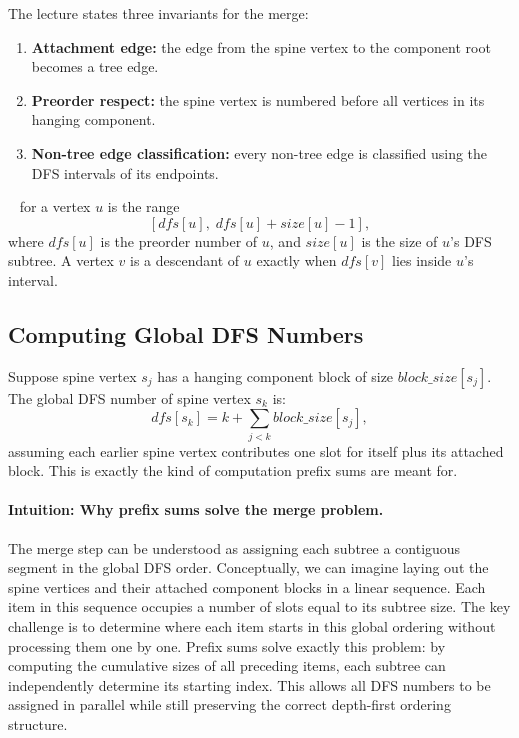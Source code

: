 The lecture states three invariants for the merge:

\begin{enumerate}
    \item \textbf{Attachment edge:} the edge from the spine vertex to the component root becomes a tree edge.
    \item \textbf{Preorder respect:} the spine vertex is numbered before all vertices in its hanging component.
    \item \textbf{Non-tree edge classification:} every non-tree edge is classified using the DFS intervals of its endpoints.
\end{enumerate}

\begin{ppdefn}
\  for a vertex \(u\) is the range
\[
    [dfs[u],\; dfs[u] + size[u] - 1],
\]
where \(dfs[u]\) is the preorder number of \(u\), and \(size[u]\) is the size of \(u\)'s DFS subtree.
A vertex \(v\) is a descendant of \(u\) exactly when \(dfs[v]\) lies inside \(u\)'s interval.
\end{ppdefn}

\subsection{Computing Global DFS Numbers}

Suppose spine vertex \(s_j\) has a hanging component block of size \(block\_size[s_j]\).
The global DFS number of spine vertex \(s_k\) is:
\[
    dfs[s_k] = k + \sum_{j < k} block\_size[s_j],
\]
assuming each earlier spine vertex contributes one slot for itself plus its attached block.
This is exactly the kind of computation prefix sums are meant for.

\paragraph{Intuition: Why prefix sums solve the merge problem.}
The merge step can be understood as assigning each subtree a contiguous segment in the global DFS order. 
Conceptually, we can imagine laying out the spine vertices and their attached component blocks in a linear sequence. 
Each item in this sequence occupies a number of slots equal to its subtree size. 
The key challenge is to determine where each item starts in this global ordering without processing them one by one. 
Prefix sums solve exactly this problem: by computing the cumulative sizes of all preceding items, each subtree can independently determine its starting index. 
This allows all DFS numbers to be assigned in parallel while still preserving the correct depth-first ordering structure.

